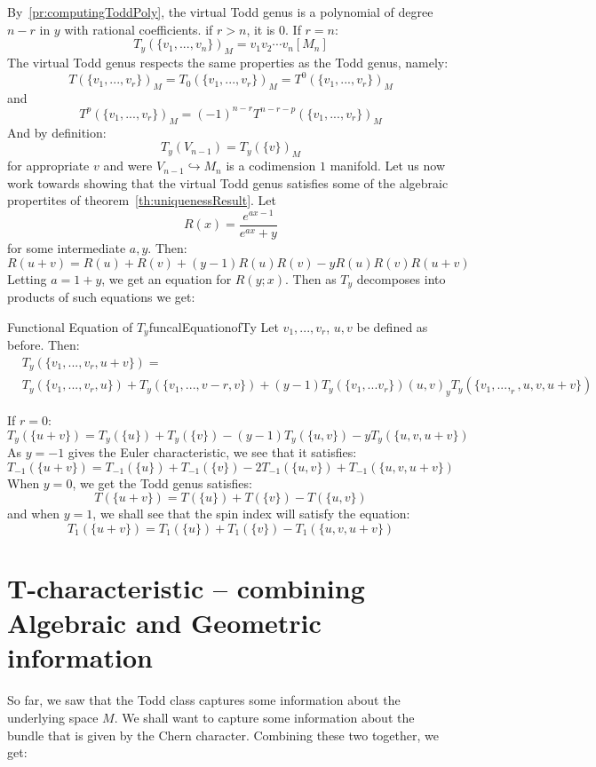 \documentclass{ut-thesis}
\begin{document}
By~\cref{pr:computingToddPoly}, the virtual Todd genus is a polynomial of degree $n-r$ in $y$ with rational
coefficients. if $r > n$, it is $0$. If $r = n$:
\[
  T_y(\{v_1, ..., v_n\})_M = v_1v_2\cdots v_n[M_n]
\]
The virtual Todd genus respects the same properties as the Todd genus, namely:
\[
  T(\{v_1, ..., v_r\})_M = T_0(\{v_1, ..., v_r\})_M = T^0(\{v_1, ..., v_r\})_M
\]
and
\[
  T^p(\{v_1, ..., v_r\})_M = (-1)^{n-r} T^{n-r-p}(\{v_1, ..., v_r\})_M
\]
And by definition:
\[
  T_y(V_{n-1}) = T_y(\{v\})_M
\]
for appropriate $v$ and were $V_{n-1} \hookrightarrow M_n$ is a codimension $1$ manifold. Let us now work
towards showing that the virtual Todd genus satisfies some of the algebraic propertites of
theorem~\cref{th:uniquenessResult}. Let
\[
R(x) = \frac{e^{ax-1}}{e^{ax}+y}
\]
for some intermediate $a,y$. Then:
\[
  R(u+v) = R(u) + R(v) + (y-1)R(u)R(v) - yR(u)R(v)R(u+v)
\]
Letting $a = 1+y$, we get an equation for $R(y;x)$. Then as $T_y$ decomposes into products of such equations
we get:

\begin{thm}{Functional Equation of $T_y$}{funcalEquationofTy}
  Let $v_1, ..., v_r$, $u,v$ be defined as before. Then:
  \begin{align*}
    &T_y(\{v_1, ..., v_r, u+v\}) =\\
    &T_y(\{v_1, ..., v_r, u\}) + T_y(\{v_1, ..., v-r, v\}) + (y-1)T_y(\{v_1,. .. v_r\})(u,v)
    _ yT_y(\{v_1, ..., _r, u,v,u+v\})
  \end{align*}
\end{thm}

If $r = 0$:
\[
  T_y(\{u+v\})  =T_y(\{u\}) + T_y(\{v\}) - (y-1)T_y(\{u,v\}) - yT_y(\{u,v,u+v\})
\]
As $y=-1$ gives the Euler characteristic, we see that it satisfies:
\[
  T_{-1}(\{u+v\}) = T_{-1}(\{u\}) + T_{-1}(\{v\}) - 2T_{-1}(\{u,v\}) + T_{-1}(\{u,v,u+v\})
\]
When $y  =0$, we get the Todd genus satisfies:
\[
  T(\{u+v\})  =T(\{u\}) + T(\{v\}) - T(\{u,v\})
\]
and when $y=1$, we shall see that the spin index will satisfy the equation:
\[
  T_1(\{u+v\}) = T_1(\{u\}) + T_1(\{v\}) - T_1(\{u,v,u+v\})
\]

\section{T-characteristic -- combining Algebraic and Geometric information}\label{sec:T-Char}

So far, we saw that the Todd class captures some information about the underlying space $M$. We shall want
to capture some information about the bundle that is given by the Chern character. Combining these
two together, we get:
\end{document}
